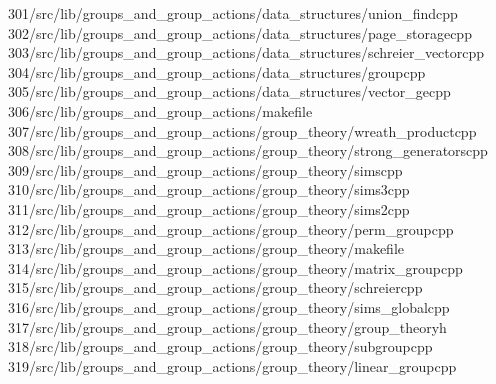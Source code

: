 \begin{tabbing}
301\>/src/lib/groups\_and\_group\_actions/data\_structures/union\_findcpp\\[0pt]
302\>/src/lib/groups\_and\_group\_actions/data\_structures/page\_storagecpp\\[0pt]
303\>/src/lib/groups\_and\_group\_actions/data\_structures/schreier\_vectorcpp\\[0pt]
304\>/src/lib/groups\_and\_group\_actions/data\_structures/groupcpp\\[0pt]
305\>/src/lib/groups\_and\_group\_actions/data\_structures/vector\_gecpp\\[0pt]
306\>/src/lib/groups\_and\_group\_actions/makefile\\[0pt]
307\>/src/lib/groups\_and\_group\_actions/group\_theory/wreath\_productcpp\\[0pt]
308\>/src/lib/groups\_and\_group\_actions/group\_theory/strong\_generatorscpp\\[0pt]
309\>/src/lib/groups\_and\_group\_actions/group\_theory/simscpp\\[0pt]
310\>/src/lib/groups\_and\_group\_actions/group\_theory/sims3cpp\\[0pt]
311\>/src/lib/groups\_and\_group\_actions/group\_theory/sims2cpp\\[0pt]
312\>/src/lib/groups\_and\_group\_actions/group\_theory/perm\_groupcpp\\[0pt]
313\>/src/lib/groups\_and\_group\_actions/group\_theory/makefile\\[0pt]
314\>/src/lib/groups\_and\_group\_actions/group\_theory/matrix\_groupcpp\\[0pt]
315\>/src/lib/groups\_and\_group\_actions/group\_theory/schreiercpp\\[0pt]
316\>/src/lib/groups\_and\_group\_actions/group\_theory/sims\_globalcpp\\[0pt]
317\>/src/lib/groups\_and\_group\_actions/group\_theory/group\_theoryh\\[0pt]
318\>/src/lib/groups\_and\_group\_actions/group\_theory/subgroupcpp\\[0pt]
319\>/src/lib/groups\_and\_group\_actions/group\_theory/linear\_groupcpp\\[0pt]

\end{tabbing}
